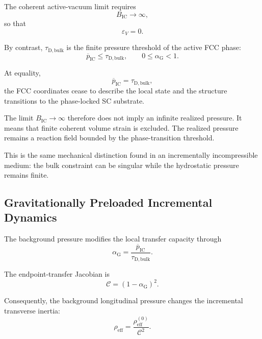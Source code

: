 The coherent active-vacuum limit requires
\begin{equation}
    \boxed{ B_{\mathrm{IC}} \rightarrow \infty },
\end{equation}
so that
\begin{equation}
    \varepsilon_V = 0.
\end{equation}

By contrast, $\tau_{\mathrm{D,bulk}}$ is the finite pressure threshold of the active FCC phase:
\begin{equation}
    \boxed{ \overline{p}_{\mathrm{IC}} \leq \tau_{\mathrm{D,bulk}}, \qquad 0 \leq \alpha_{\mathrm{G}} < 1 }.
\end{equation}

At equality,
\begin{equation}
    \overline{p}_{\mathrm{IC}} = \tau_{\mathrm{D,bulk}},
\end{equation}
the FCC coordinates cease to describe the local state and the structure transitions to the phase-locked SC substrate.

The limit $B_{\mathrm{IC}} \rightarrow \infty$ therefore does not imply an infinite realized pressure. It means that finite coherent volume strain is excluded. The realized pressure remains a reaction field bounded by the phase-transition threshold.

This is the same mechanical distinction found in an incrementally incompressible medium: the bulk constraint can be singular while the hydrostatic pressure remains finite.

\subsection{Gravitationally Preloaded Incremental Dynamics}

The background pressure modifies the local transfer capacity through
\begin{equation}
    \alpha_{\mathrm{G}} = \frac{ \overline{p}_{\mathrm{IC}} }{ \tau_{\mathrm{D,bulk}} }.
\end{equation}

The endpoint-transfer Jacobian is
\begin{equation}
    \mathcal{C} = \left( 1-\alpha_{\mathrm{G}} \right)^2.
\end{equation}

Consequently, the background longitudinal pressure changes the incremental transverse inertia:
\begin{equation}
    \rho_{\mathrm{eff}} = \frac{ \rho_{\mathrm{eff}}^{(0)} }{ \mathcal{C}^2 }.
\end{equation}

